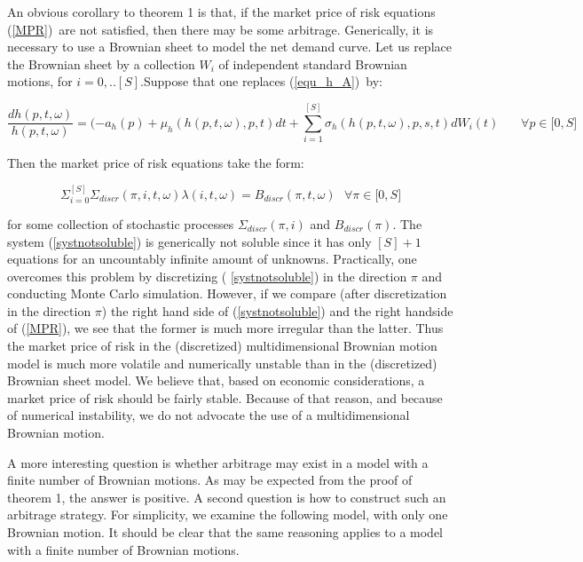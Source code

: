 \documentclass{article}
\begin{document}
An obvious corollary to theorem 1 is that, if the market price of risk
equations (\ref{MPR})\ are not satisfied, then there may be some arbitrage.
Generically, it is necessary to use a Brownian sheet to model the net demand
curve. Let us replace the Brownian sheet by a collection $W_{i}$ of
independent standard Brownian motions, for $i=0,..[S].$Suppose that one
replaces (\ref{equ_h_A})\ by:

\begin{equation*}
\frac{dh(p,t,\omega )}{h(p,t,\omega )}=(-a_{h}(p)+\mu _{h}(h(p,t,\omega
),p,t)dt+\sum_{i=1}^{[S]}\sigma _{h}(h(p,t,\omega ),p,s,t)dW_{i}(t)\ \ \ \ \
\ \ \ \forall p\in \lbrack 0,S]
\end{equation*}

Then the market price of risk equations take the form:

\begin{equation}
\Sigma _{i=0}^{[S]}\Sigma _{discr}(\pi ,i,t,\omega )\lambda (i,t,\omega
)=B_{discr}(\pi ,t,\omega )\text{ \ \ }\forall \pi \in \lbrack 0,S]
\label{systnotsoluble}
\end{equation}

for some collection of stochastic processes $\Sigma _{discr}(\pi ,i)$ and $%
B_{discr}(\pi )$. The system (\ref{systnotsoluble}) is generically not
soluble since it has only $[S]+1$ equations for an uncountably infinite
amount of unknowns. Practically, one overcomes this problem by discretizing (%
\ref{systnotsoluble}) in the direction $\pi $ and conducting Monte Carlo
simulation. However, if we compare (after discretization in the direction $%
\pi $) the right hand side of (\ref{systnotsoluble}) and the right handside
of (\ref{MPR}), we see that the former is much more irregular than the
latter. Thus the market price of risk in the (discretized) multidimensional
Brownian motion model is much more volatile and numerically unstable than in
the (discretized) Brownian sheet model. We believe that, based on economic
considerations, a market price of risk should be fairly stable. Because of
that reason, and because of numerical instability, we do not advocate the
use of a multidimensional Brownian motion.

\bigskip

A more interesting question is whether arbitrage may exist in a model with a
finite number of Brownian motions. As may be expected from the proof of
theorem 1, the answer is positive. A second question is how to construct
such an arbitrage strategy. For simplicity, we examine the following model,
with only one Brownian motion. It should be clear that the same reasoning
applies to a model with a finite number of Brownian motions.
\end{document}
